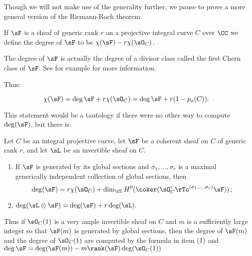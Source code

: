 Though we will not make use of the generality further, we pause to prove a more general version of the Riemann-Roch theorem.

\begin{definition}
 If $\sF$ is a sheaf of generic rank $r$ on a projective integral curve $C$ over $\CC$ we define the degree
 of $\sF$ to be $\chi(\sF) -r\chi(\sO_C)$.
\end{definition}

\begin{fact}
The degree of $\sF$ is actually the degree of a divisor class called the first Chern class of $\sF$. See
for example \cite[Chapter ***]{3264}
for more information. 
\end{fact}

Thus:
\begin{theorem}\label{general RR without duality}
$$
 \chi(\sF) = \deg \sF + r\chi(\sO_C) = \deg \sF + r(1-p_a(C)).
 $$
\end{theorem}
 
This statement would be
a tautology if there were no other way to compute $\deg(\sF)$, but there is:

\begin{lemma} Let $C$ be an integral projective curve, let $\sF$ be a coherent sheaf on $C$ of generic rank $r$, and let $\sL$ be an invertible sheaf on $C$.
\begin{enumerate}
\item If $\sF$ is generated by its global sections and $\sigma_1,\dots, \sigma_r$ is a maximal generically independent
collection of global sections,  then 
$$
\deg (\sF) = r \chi(\sO_C)+
\dim_\CC H^0(\coker(\sO_C^r \rTo^{(\sigma_1,\dots, \sigma_r)}\sF))\,;
$$

\item $\deg (\sL \otimes \sF) = \deg (\sF) +r\deg (\sL).$

\end{enumerate}
Thus if $\sO_C(1)$ is a very ample invertible sheaf on $C$ and $m$ is a sufficiently large integer so that
$\sF(m)$ is generated by global sections, then the degree of $\sF(m)$ and the degree of $\sO_C(1)$ are computed by the formula in item (1)
and $\deg \sF = \deg(\sF(m)) - m \rank(\sF) \deg (\sO_C(1))$
\end{lemma}

